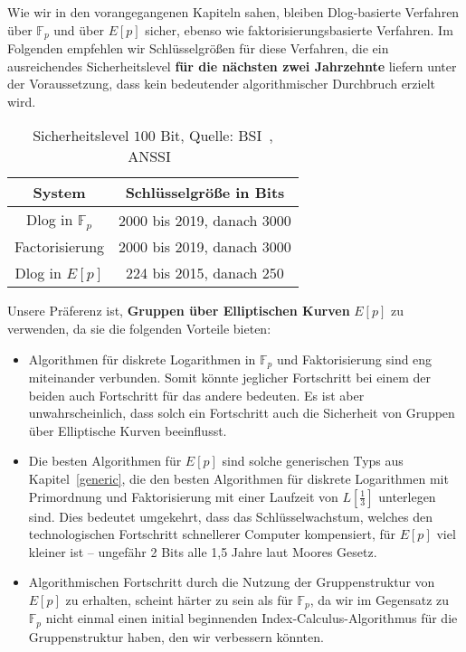 \begin{refsegment}
Wie wir in den vorangegangenen Kapiteln sahen, bleiben Dlog-basierte Verfahren über $\mathbb{F}_p$ und über $E[p]$ sicher, ebenso wie faktorisierungsbasierte Verfahren. Im Folgenden empfehlen wir Schlüsselgrößen für diese Verfahren, die ein ausreichendes Sicherheitslevel \textbf{für die nächsten zwei Jahrzehnte} liefern unter der Voraussetzung, dass kein bedeutender algorithmischer Durchbruch erzielt wird.
%
\begin{table}[h]
\begin{center}
\begin{tabular}{c|c}
System & Schlüsselgröße in Bits\\
\hline
Dlog in $\mathbb{F}_p$ & 2000 bis 2019, danach 3000\\
Factorisierung & 2000 bis 2019, danach 3000\\
Dlog in $E[p]$ & 224 bis 2015, danach 250\\
\end{tabular}
\caption{Sicherheitslevel $100$ Bit, Quelle: BSI~\cite{BSI2012}, ANSSI~\cite{refanssi2013}}
\end{center}
\end{table}


Unsere Präferenz ist, \textbf{Gruppen über Elliptischen Kurven} $E[p]$ zu verwenden, da sie die folgenden Vorteile bieten:
\begin{itemize}
\item Algorithmen für diskrete Logarithmen in $\mathbb{F}_p$ und Faktorisierung sind eng miteinander verbunden. Somit könnte jeglicher Fortschritt bei einem der beiden auch Fortschritt für das andere bedeuten. Es ist aber unwahrscheinlich, dass solch ein Fortschritt auch die Sicherheit von Gruppen über Elliptische Kurven beeinflusst.
\item Die besten Algorithmen für $E[p]$ sind solche generischen Typs aus Kapitel~\ref{generic}, die den besten Algorithmen für diskrete Logarithmen mit Primordnung und Faktorisierung mit einer Laufzeit von $L[\frac 1 3]$ unterlegen sind. Dies bedeutet umgekehrt, dass das Schlüsselwachstum, welches den technologischen Fortschritt schnellerer Computer kompensiert, für $E[p]$ viel kleiner ist -- ungefähr 2 Bits alle 1,5 Jahre laut Moores Gesetz.
\item Algorithmischen Fortschritt durch die Nutzung der Gruppenstruktur von $E[p]$ zu erhalten, scheint härter zu sein als für $\mathbb{F}_p$, da wir im Gegensatz zu $\mathbb{F}_p$ nicht einmal einen initial beginnenden Index-Calculus-Algorithmus für die Gruppenstruktur haben, den wir verbessern könnten.


\end{itemize}
\end{refsegment}
